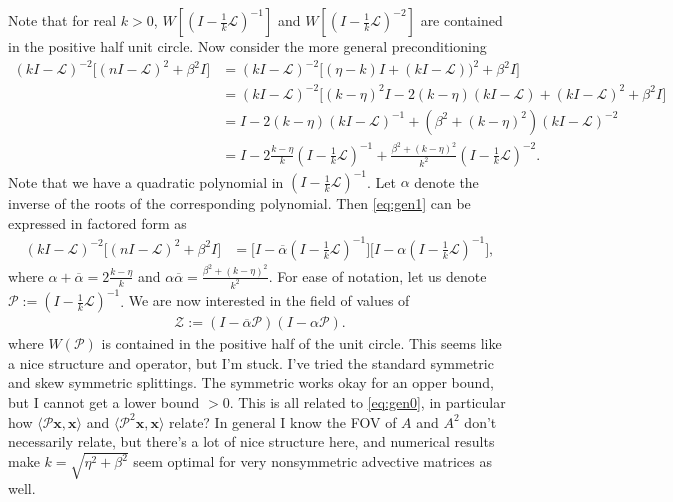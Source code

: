 \documentclass[a4paper,10pt]{article}
\begin{document}
Note that for real $k>0$, $W\left[\left(I - \tfrac{1}{k}\mathcal{L}\right)^{-1}\right]$ and
$W\left[\left(I - \tfrac{1}{k}\mathcal{L}\right)^{-2}\right]$ are contained in
the positive half unit circle. Now consider the more general preconditioning
%
\begin{align}\nonumber
(kI - \mathcal{L})^{-2}\Big[(nI - \mathcal{L})^2 + \beta^2 I\Big] 
	& = (kI - \mathcal{L})^{-2}\Big[(\eta-k)I + (kI - \mathcal{L}))^2 + \beta^2 I\Big] \\
& = (kI - \mathcal{L})^{-2}\Big[(k-\eta)^2I - 2(k-\eta)(kI - \mathcal{L}) + (kI - \mathcal{L})^2 + \beta^2 I\Big] \nonumber\\
& = I - 2(k-\eta)(kI - \mathcal{L})^{-1} + (\beta^2 + (k-\eta)^2)(kI - \mathcal{L})^{-2} \nonumber\\
& = I - 2\frac{k-\eta}{k}\left(I - \tfrac{1}{k}\mathcal{L}\right)^{-1} + \frac{\beta^2 + (k-\eta)^2}{k^2}
	\left(I - \tfrac{1}{k}\mathcal{L}\right)^{-2}.\label{eq:gen0}
\end{align}
%
Note that we have a quadratic polynomial in $\left(I - \tfrac{1}{k}\mathcal{L}\right)^{-1}$.
Let $\alpha$ denote the inverse of the roots of the corresponding polynomial.
Then \eqref{eq:gen1} can be expressed in factored form as
%
\begin{align*}
(kI - \mathcal{L})^{-2}\Big[(nI - \mathcal{L})^2 + \beta^2 I\Big] 
	& = \Big[I - \overline{\alpha}\left(I - \tfrac{1}{k}\mathcal{L}\right)^{-1}\Big]
	\Big[I - \alpha\left(I - \tfrac{1}{k}\mathcal{L}\right)^{-1}\Big],
\end{align*}
%
where $\alpha + \overline{\alpha} = 2\tfrac{k-\eta}{k}$ and $\alpha\overline{\alpha}
= \tfrac{\beta^2 + (k-\eta)^2}{k^2}$. For ease of notation, let us denote
$\mathcal{P} := \left(I - \tfrac{1}{k}\mathcal{L}\right)^{-1}$.
{\color{blue}
We are now interested in the field of values of 
%
\begin{align*}
\mathcal{Z} := (I - \overline{\alpha}\mathcal{P})(I - {\alpha}\mathcal{P}).
\end{align*}
%
where $W(\mathcal{P})$ is contained in the positive half of the unit circle.
This seems like a nice structure and operator, but I'm stuck. I've tried the
standard symmetric and skew symmetric splittings. The symmetric works okay for
an opper bound, but I cannot get a lower bound $> 0$. This is all related to
\eqref{eq:gen0}, in particular how $\langle \mathcal{P}\mathbf{x},\mathbf{x}\rangle$
and $\langle \mathcal{P}^2\mathbf{x},\mathbf{x}\rangle$ relate? In general I know
the FOV of $A$ and $A^2$ don't necessarily relate, but there's a lot of nice
structure here, and numerical results make $k = \sqrt{\eta^2+\beta^2}$ seem
optimal for very nonsymmetric advective matrices as well.
}
\end{document}
